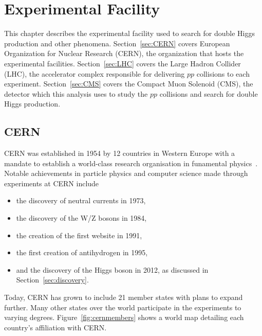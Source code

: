 
\chapter{Experimental Facility\label{ch:experiment}}

This chapter describes the experimental facility used to search for double Higgs production and other phenomena. Section~\ref{sec:CERN} covers European Organization for Nuclear Research (CERN), the organization
that hosts the experimental facilities. Section~\ref{sec:LHC} covers the Large Hadron Collider (LHC), the accelerator complex responsible for delivering $pp$ collisions to each experiment.
Section~\ref{sec:CMS}
covers the Compact Muon Solenoid (CMS), the detector which this analysis uses to study the $pp$ collisions and search for double Higgs production.


\section{CERN\label{sec:CERN}}

CERN was established in 1954 by 12 countries in Western Europe with a mandate to establish a
world-class research organisation in funamental physics~\cite{cern:public}. Notable
achievements in particle physics and computer science made through experiments at CERN include

\begin{itemize}
\item the discovery of neutral currents in 1973,
\item the discovery of the W/Z bosons in 1984,
\item the creation of the first website in 1991,
\item the first creation of antihydrogen in 1995,
\item and the discovery of the Higgs boson in 2012, as discussed in Section~\ref{sec:discovery}.
\end{itemize}

Today, CERN has grown to include 21 member states with plans to expand further. Many other states
over the world participate in the experiments to varying degrees. Figure~\ref{fig:cernmembers}
shows a world map detailing each country's affiliation with CERN.

